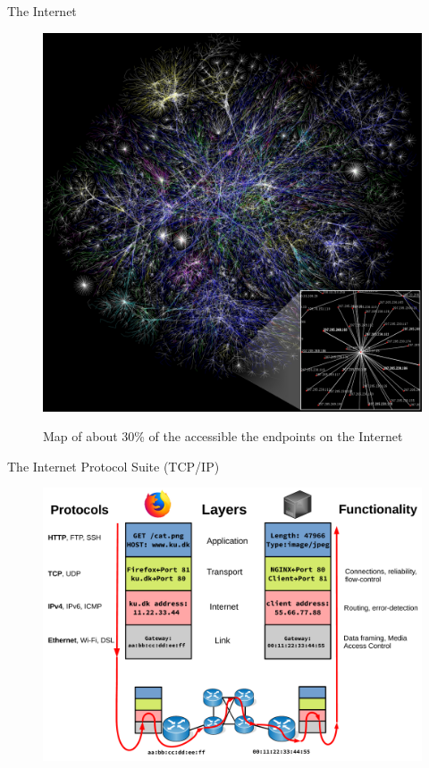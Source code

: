 \begin{frame}
The Internet

\begin{figure}
	\centering
\includegraphics[scale=0.15]{./background/internet_map.jpg}
\label{fig: Internet map}
\caption{Map of about 30\% of the accessible the endpoints on the Internet}
\end{figure}

\end{frame}


\begin{frame}
The Internet Protocol Suite (TCP/IP)
\begin{figure}
	\centering
\includegraphics[scale=0.28]{./background/internet_scenario.pdf}
\end{figure}
\end{frame}

